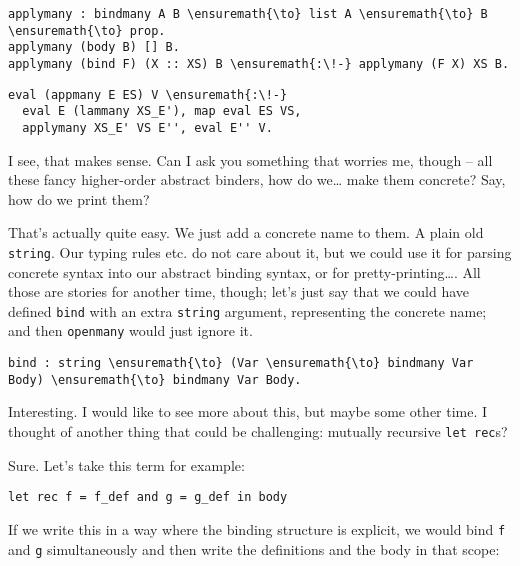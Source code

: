 \importantCodeblock{}

\begin{verbatim}
applymany : bindmany A B \ensuremath{\to} list A \ensuremath{\to} B \ensuremath{\to} prop.
applymany (body B) [] B.
applymany (bind F) (X :: XS) B \ensuremath{:\!-} applymany (F X) XS B.
\end{verbatim}

\importantCodeblockEnd{}

\importantCodeblock{}

\begin{verbatim}
eval (appmany E ES) V \ensuremath{:\!-}
  eval E (lammany XS_E'), map eval ES VS,
  applymany XS_E' VS E'', eval E'' V.
\end{verbatim}

\importantCodeblockEnd{}

\heroSTUDENT{} I see, that makes sense. Can I ask you something that worries
me, though -- all these fancy higher-order abstract binders, how do
we\ldots{} make them concrete? Say, how do we print them?

\heroADVISOR{} That's actually quite easy. We just add a concrete name to
them. A plain old \texttt{string}. Our typing rules etc. do not care
about it, but we could use it for parsing concrete syntax into our
abstract binding syntax, or for pretty-printing\ldots{}. All those are
stories for another time, though; let's just say that we could have
defined \texttt{bind} with an extra \texttt{string} argument,
representing the concrete name; and then \texttt{openmany} would just
ignore it.

\begin{verbatim}
bind : string \ensuremath{\to} (Var \ensuremath{\to} bindmany Var Body) \ensuremath{\to} bindmany Var Body.
\end{verbatim}

\heroSTUDENT{} Interesting. I would like to see more about this, but maybe
some other time. I thought of another thing that could be challenging:
mutually recursive \texttt{let\ rec}s?

\heroADVISOR{} Sure. Let's take this term for example:

\begin{verbatim}
let rec f = f_def and g = g_def in body
\end{verbatim}

\noindent
If we write this in a way where the binding structure is explicit, we
would bind \texttt{f} and \texttt{g} simultaneously and then write the
definitions and the body in that scope:

